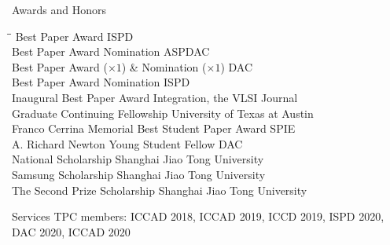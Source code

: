 
\begin{rSection}{Awards and Honors}
\begin{tabbing}
\hspace{3.3in}\= \hspace{3.1in}\= \kill
Best Paper Award \> ISPD  \\
Best Paper Award Nomination \> ASPDAC  \\
Best Paper Award ($\times 1$) \& Nomination ($\times 1$) \> DAC  \\
Best Paper Award Nomination \> ISPD  \\
Inaugural Best Paper Award \> Integration, the VLSI Journal  \\
Graduate Continuing Fellowship \> University of Texas at Austin  \\
Franco Cerrina Memorial Best Student Paper Award \> SPIE  \\
A. Richard Newton Young Student Fellow \> DAC  \\
    National Scholarship \> Shanghai Jiao Tong University  \\
    Samsung Scholarship \> Shanghai Jiao Tong University  \\
    The Second Prize Scholarship \> Shanghai Jiao Tong University 
\end{tabbing}
\end{rSection}

\begin{rSection}{Services}
TPC members: ICCAD 2018, ICCAD 2019, ICCD 2019, ISPD 2020, DAC 2020, ICCAD 2020
\end{rSection}
